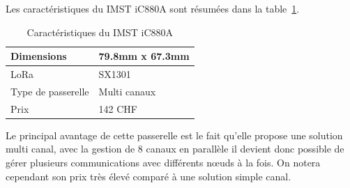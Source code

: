 Les caractéristiques du IMST iC880A sont résumées dans la table~\ref{tab:imst_cara}.

\begin{table}[H]
\caption[Caractéristiques du IMST iC880A]{Caractéristiques du IMST iC880A}
\label{tab:imst_cara}
\centering
\begin{tabular}{ l | l }
\toprule
Dimensions & 79.8mm x 67.3mm \\
\midrule
LoRa & SX1301 \\
\midrule
Type de passerelle & Multi canaux \\
\midrule
Prix & 142 CHF \\
\bottomrule
\end{tabular}
\end{table}

Le principal avantage de cette passerelle est le fait qu’elle propose une solution multi canal, avec la gestion de 8 canaux en parallèle il devient donc possible de gérer plusieurs communications avec différents nœuds à la fois. On notera cependant son prix très élevé comparé à une solution simple canal.
